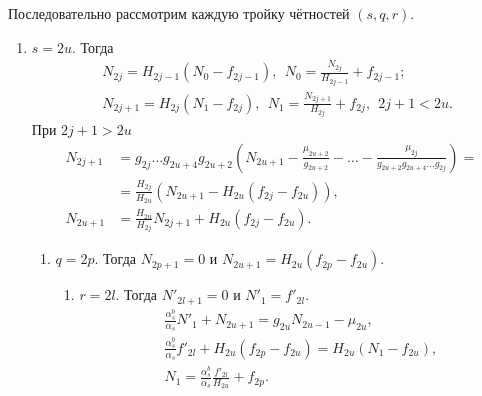 Последовательно рассмотрим каждую тройку чётностей \((s,q,r)\).
\begin{enumerate}
    \item \(s=2u\). Тогда 
    \begin{equation*}
        \begin{split}
            & N_{2j} = H_{2j-1} (N_0 - f_{2j-1}), ~~ N_0 = \frac{N_{2j}}{H_{2j-1}} + f_{2j-1}; \\
            & N_{2j+1} = H_{2j}(N_1 - f_{2j}), ~~ N_1 = \frac{N_{2j+1}}{H_{2j}} + f_{2j}, ~~ 2j+1 < 2u.
        \end{split}
    \end{equation*}
    При \(2j+1 > 2u\)
    \begin{equation*}
        \begin{split}
            N_{2j+1} &= g_{2j} \dots g_{2u+4} g_{2u+2} \left( N_{2u+1} - \frac{\mu_{2u+2}}{g_{2u+2}} - \dots - \frac{\mu_{2j}}{g_{2u+2} g_{2u+4} \dots g_{2j}} \right) = \\
            & = \frac{H_{2j}}{H_{2u}} \left( N_{2u+1} - H_{2u} (f_{2j} - f_{2u}) \right), \\
            N_{2u+1} &= \frac{H_{2u}}{H_{2j}} N_{2j+1} + H_{2u} (f_{2j} - f_{2u}).
        \end{split}
    \end{equation*}
    
    \begin{enumerate}
        \item \(q=2p\). Тогда \(N_{2p+1} = 0\) и \(N_{2u+1} = H_{2u} (f_{2p} - f_{2u}) \).
        
        \begin{enumerate}
            \item \(r=2l\). Тогда \(N'_{2l+1} = 0\) и \(N'_1 = f'_{2l}\).
            \begin{equation*}
                \begin{split}
                    & \frac{\alpha^b_s}{\alpha_s} N'_1 + N_{2u+1} = g_{2u} N_{2u-1} - \mu_{2u}, \\
                    & \frac{\alpha^b_s}{\alpha_s} f'_{2l} + H_{2u} (f_{2p} - f_{2u}) = H_{2u} (N_1 - f_{2u}), \\
                    & N_1 = \frac{\alpha^b_s}{\alpha_s} \frac{f'_{2l}}{H_{2u}} + f_{2p}.
                \end{split}
            \end{equation*}
            

\end{enumerate}
\end{enumerate}
\end{enumerate}
